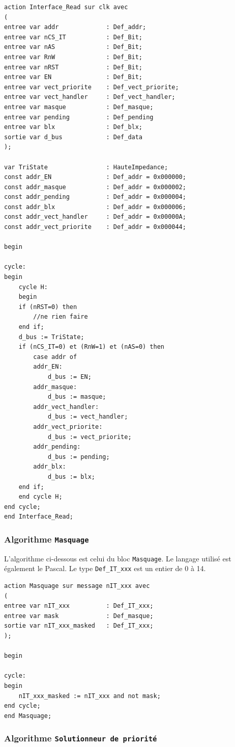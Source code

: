 \begin{lstlisting}[style=pascalstyle]
action Interface_Read sur clk avec
(
entree var addr 			: Def_addr;
entree var nCS_IT 			: Def_Bit;
entree var nAS 				: Def_Bit;
entree var RnW 				: Def_Bit;
entree var nRST 			: Def_Bit;
entree var EN 				: Def_Bit;
entree var vect_priorite 	: Def_vect_priorite;
entree var vect_handler 	: Def_vect_handler;
entree var masque 			: Def_masque;
entree var pending 			: Def_pending
entree var blx 				: Def_blx;
sortie var d_bus 			: Def_data
);

var TriState 				: HauteImpedance;
const addr_EN	     		: Def_addr = 0x000000;
const addr_masque   		: Def_addr = 0x000002;
const addr_pending 			: Def_addr = 0x000004;
const addr_blx 				: Def_addr = 0x000006;
const addr_vect_handler 	: Def_addr = 0x00000A;
const addr_vect_priorite 	: Def_addr = 0x000044;

begin

cycle:
begin
	cycle H:
	begin
	if (nRST=0) then
		//ne rien faire
	end if;
	d_bus := TriState;
	if (nCS_IT=0) et (RnW=1) et (nAS=0) then
		case addr of
		addr_EN:
			d_bus := EN;
		addr_masque:
			d_bus := masque;
		addr_vect_handler:
			d_bus := vect_handler;
		addr_vect_priorite:
			d_bus := vect_priorite;
		addr_pending:
			d_bus := pending;
		addr_blx:
			d_bus := blx;
	end if;
	end cycle H;
end cycle;
end Interface_Read;
\end{lstlisting}

\newpage

\subsubsection{Algorithme \texttt{Masquage}}

L'algorithme ci-dessous est celui du bloc \texttt{Masquage}.
Le langage utilisé est également le Pascal.
Le type \texttt{Def\_IT\_xxx} est un entier de 0 à 14. 

\begin{lstlisting}[style=pascalstyle]
action Masquage sur message nIT_xxx avec
(
entree var nIT_xxx 			: Def_IT_xxx;
entree var mask 			: Def_masque;
sortie var nIT_xxx_masked 	: Def_IT_xxx;
);

begin

cycle:
begin
	nIT_xxx_masked := nIT_xxx and not mask;
end cycle;
end Masquage;
\end{lstlisting}

\subsubsection{Algorithme \texttt{Solutionneur de priorité}}

